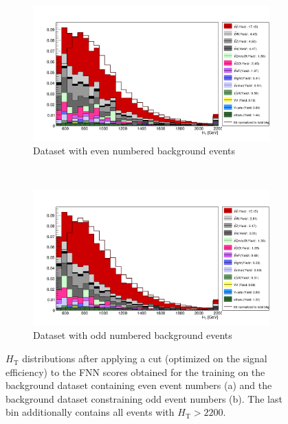 \begin{figure}[H]
\begin{subfigure}{1\textwidth}
  \centering
  \includegraphics[width=.93\linewidth]{figs/FNN/HT_all_Even}
  \caption{Dataset with even numbered background events}
  \label{fig:HTEven}
\end{subfigure} \\
\begin{subfigure}{1\textwidth}
  \centering
  \includegraphics[width=.93\linewidth]{figs/FNN/HT_all_Odd}
  \caption{Dataset with odd numbered background events}
  \label{fig:HTOdd}
\end{subfigure}
\caption{$H_{\text{T}}$ distributions after applying a cut (optimized on the signal efficiency) to the FNN scores obtained for the training on the background dataset containing even event numbers (a) and the background dataset constraining odd event numbers (b). The last bin additionally contains all events with $H_{\text{T}} > 2200$.}
\label{fig:HTFNN}
\end{figure}

